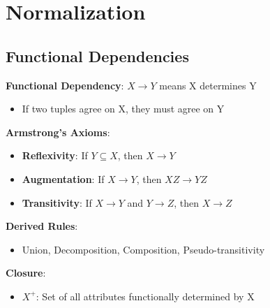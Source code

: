 \documentclass[12pt,a4paper]{report}
\begin{document}
\section{Normalization}

\subsection{Functional Dependencies}
\begin{concept}
\textbf{Functional Dependency}: $X \to Y$ means X determines Y
\begin{itemize}
    \item If two tuples agree on X, they must agree on Y
\end{itemize}

\textbf{Armstrong's Axioms}:
\begin{itemize}
    \item \textbf{Reflexivity}: If $Y \subseteq X$, then $X \to Y$
    \item \textbf{Augmentation}: If $X \to Y$, then $XZ \to YZ$
    \item \textbf{Transitivity}: If $X \to Y$ and $Y \to Z$, then $X \to Z$
\end{itemize}

\textbf{Derived Rules}:
\begin{itemize}
    \item Union, Decomposition, Composition, Pseudo-transitivity
\end{itemize}

\textbf{Closure}:
\begin{itemize}
    \item $X^+$: Set of all attributes functionally determined by X
\end{itemize}
\end{concept}
\end{document}
